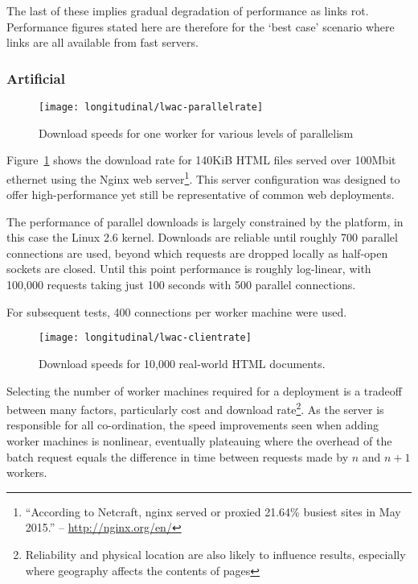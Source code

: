 The last of these implies gradual degradation of performance as links rot.  Performance figures stated here are therefore for the `best case' scenario where links are all available from fast servers.


\subsubsection{Artificial}


\begin{figure}[Ht]
    \centering
    \texttt{[image: longitudinal/lwac-parallelrate]}
    \caption{Download speeds for one worker for various levels of parallelism}
    \label{fig:longitudinal:lwac:parallelrate}
\end{figure}

Figure~\ref{fig:longitudinal:lwac:parallelrate} shows the download rate for 140KiB HTML files served over 100Mbit ethernet using the Nginx web server\footnote{``According to Netcraft, nginx served or proxied 21.64\% busiest sites in May 2015.'' -- \url{http://nginx.org/en/}}.  This server configuration was designed to offer high-performance yet still be representative of common web deployments.

The performance of parallel downloads is largely constrained by the platform, in this case the Linux 2.6 kernel.  Downloads are reliable until roughly 700 parallel connections are used, beyond which requests are dropped locally as half-open sockets are closed.  Until this point performance is roughly log-linear, with 100,000 requests taking just 100 seconds with 500 parallel connections.

For subsequent tests, 400 connections per worker machine were used.


\begin{figure}[Ht]
    \centering
    \texttt{[image: longitudinal/lwac-clientrate]}
    \caption{Download speeds for 10,000 real-world HTML documents.}
    \label{fig:longitudinal:lwac:numclients}
\end{figure}


Selecting the number of worker machines required for a deployment is a tradeoff between many factors, particularly cost and download rate\footnote{Reliability and physical location are also likely to influence results, especially where geography affects the contents of pages}.  As the server is responsible for all co-ordination, the speed improvements seen when adding worker machines is nonlinear, eventually plateauing where the overhead of the batch request equals the difference in time between requests made by $n$ and $n + 1$ workers.

